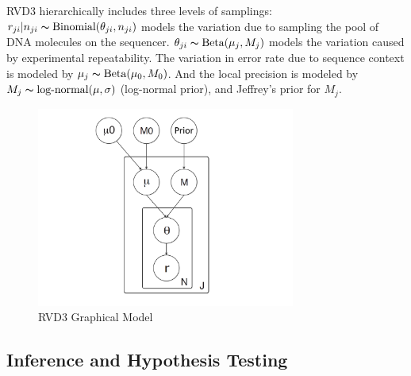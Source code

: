 \documentclass[11pt,reqno]{amsart}
\begin{document}
RVD3 hierarchically includes three levels of samplings: $r_{ji} | n_{ji} \thicksim \text{Binomial}(\theta_{ji}, n_{ji})$ models the variation due to sampling the pool of DNA molecules on the sequencer.
$\theta_{ji} \thicksim \text{Beta}(\mu_j, M_j)$ models the variation caused by experimental repeatability. The variation in error rate due to sequence context is modeled by $\mu_j \thicksim \text{Beta}(\mu_0, M_0)$.
And the local precision is modeled by $ M_{j} \thicksim \text{log-normal}(\mu, \sigma)$ (log-normal prior), and Jeffrey's prior for $M_j$.

\begin{figure}[h]
\begin{center}
\includegraphics[width=85mm]{figs/RVD3_model.pdf}
\caption{RVD3 Graphical Model}
\label{fig:graphical_model}
\end{center}
\end{figure}


\subsection{Inference and Hypothesis Testing}


\end{document}
